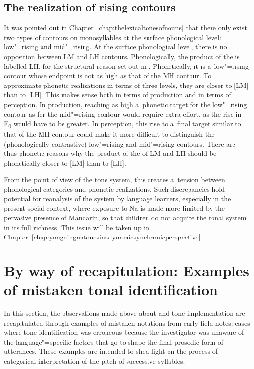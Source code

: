 \subsection{The realization of rising contours}
\label{sec:therealizationoflmlhandmhcontours}


It was pointed out in Chapter~\ref{chap:thelexicaltonesofnouns} that there only exist two types of contours on monosyllables at the
surface phonological level: low"=rising and mid"=rising. At the surface phonological level, there is
no opposition between LM and LH contours. Phonologically, the product of the  is
labelled LH, for the structural reason set out in . Phonetically, it is a~low"=rising {contour}
whose endpoint is not as high as that of the MH {contour}. To approximate phonetic realizations in
terms of three levels, they are closer to [LM] than to [LH]. This makes sense both in terms of
production and in terms of perception. In production, reaching as high a~phonetic target for the
low"=rising {contour} as for the mid"=rising {contour} would require extra effort, as the rise in
F\textsubscript{0} would have to be greater. In perception, this rise to
a~final target similar to that of the MH contour could make it more difficult to distinguish the
(phonologically contrastive) low"=rising and mid"=rising contours. There are thus phonetic reasons why
the product of the  of LM and LH should be phonetically closer to [LM] than to
[LH].

From the point of view of the tone system, this creates a~tension between phonological categories
and phonetic realizations. Such discrepancies hold potential for reanalysis of the system by language learners, especially in the
present social context, where exposure to Na is made more limited by the pervasive presence of
{Mandarin}, so that children do not acquire the tonal system in its full richness. This issue
will be taken up in Chapter~\ref{chap:yongningnatonesinadynamicsynchronicperspective}.


\section{By way of recapitulation: Examples of mistaken tonal identification}
\label{sec:examplesofmistakeninterpretationsoftonalsequencesforwantoftakingtoneimplementationrulesintoaccount}

In this section, the observations made above about  and tone implementation are recapitulated through examples of mistaken notations from early field notes: cases where tone identification was erroneous because the investigator was unaware of the language"=specific factors that go to shape the final prosodic form of utterances. These examples are intended to shed light on the process of
categorical interpretation of the pitch of successive syllables. 


